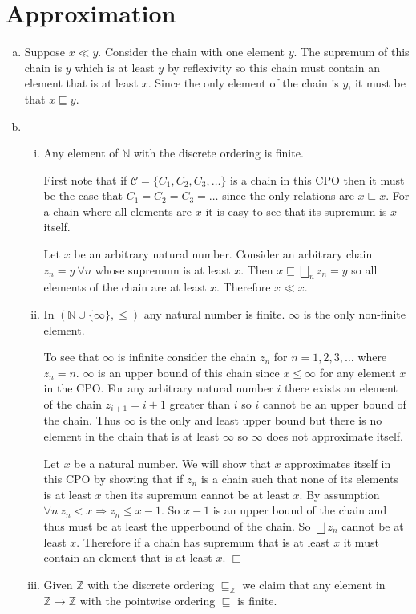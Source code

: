 \section{Approximation}
\begin{enumerate}[(a)]
\item Suppose $x \ll y$. Consider the chain with one element $y$. The supremum of this chain is $y$ which is at least $y$ by reflexivity so this chain must contain an element that is at least $x$. Since the only element of the chain is $y$, it must be that $x \sqsubseteq y$.
\item
  \begin{enumerate}[i.]
  \item Any element of $\mathbb N$ with the discrete ordering is finite. 

  First note that if $\mathcal C = \{C_1, C_2, C_3, \ldots\}$ is a chain in this CPO then it must be the case that $C_1 = C_2 = C_3 = \ldots$ since the only relations are $x \sqsubseteq x$. For a chain where all elements are $x$ it is easy to see that its supremum is $x$ itself.

  Let $x$ be an arbitrary natural number. Consider an arbitrary chain $z_n = y ~ \forall n$ whose supremum is at least $x$. Then $x \sqsubseteq \bigsqcup\limits_{n} z_n = y$ so all elements of the chain are at least $x$. Therefore $x \ll x$.
  \item In $(\mathbb N \cup \{\infty\}, \leq)$ any natural number is finite. $\infty$ is the only non-finite element.

  To see that $\infty$ is infinite consider the chain $z_n$ for $n = 1,2,3, \ldots$ where $z_n  = n$. $\infty$ is an upper bound of this chain since $x \leq \infty$ for any element $x$ in the CPO. For any arbitrary natural number $i$ there exists an element of the chain $z_{i+1} = i+1$ greater than $i$ so $i$ cannot be an upper bound of the chain. Thus $\infty$ is the only and least upper bound but there is no element in the chain that is at least $\infty$ so $\infty$ does not approximate itself.

  Let $x$ be a natural number. We will show that $x$ approximates itself in this CPO by showing that if $z_n$ is a chain such that none of its elements is at least $x$ then its supremum cannot be at least $x$. By assumption $\forall n ~ z_n < x\Rightarrow z_n \leq x-1$. So $x-1$ is an upper bound of the chain and thus must be at least the upperbound of the chain. So $\bigsqcup z_n$ cannot be at least $x$. Therefore if a chain has supremum that is at least $x$ it must contain an element that is at least $x$. $\Box$
  \item Given $\mathbb Z$ with the discrete ordering $\sqsubseteq_{\mathbb Z}$ we claim that any element in $\mathbb Z \rightarrow \mathbb Z$ with the pointwise ordering $\sqsubseteq$ is finite.


\end{enumerate}
\end{enumerate}
